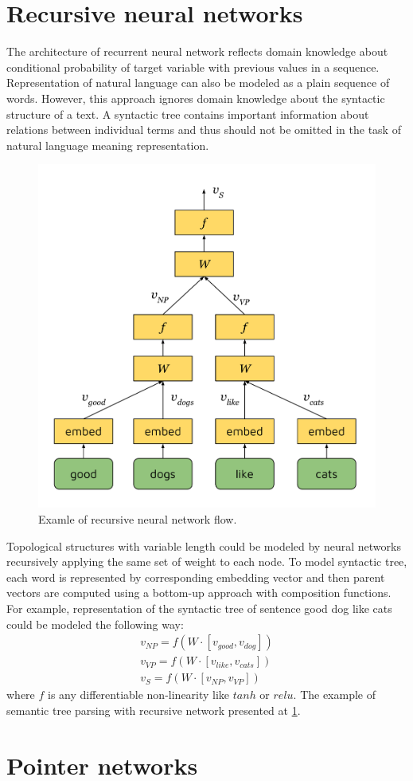 \section{Recursive neural networks}
The architecture of recurrent neural network reflects domain knowledge about conditional probability of target variable with previous values in a sequence. Representation of natural language can also be modeled as a plain sequence of words. However, this approach ignores domain knowledge about the syntactic structure of a text. A syntactic tree contains important information about relations between individual terms and thus should not be omitted in the task of natural language meaning representation.
\begin{figure}
\centering
\includegraphics{Figures/rvnn}
\decoRule
\caption[RvNN flow]{Examle of recursive neural network flow.}
\label{fig:rvnn}
\end{figure}
Topological structures with variable length could be modeled by neural networks recursively applying the same set of weight to each node. To model syntactic tree, each word is represented by corresponding embedding vector and then parent vectors are computed using a bottom-up approach with composition functions. For example, representation of the syntactic tree of sentence good dog like cats could be modeled the following way:
\begin{equation}
\begin{split}
v_{NP} = f(W\cdot[v_{good}, v_{dog}])\\
v_{VP} = f(W\cdot[v_{like}, v_{cats}])\\
v_S = f(W\cdot[v_{NP}, v_{VP}])
\label{rvnn:example}
\end{split}
\end{equation}
where $f$ is any differentiable non-linearity like $tanh$ or $relu$. The example of semantic tree parsing with recursive network presented at \ref{fig:rvnn}. 

\section{Pointer networks}
